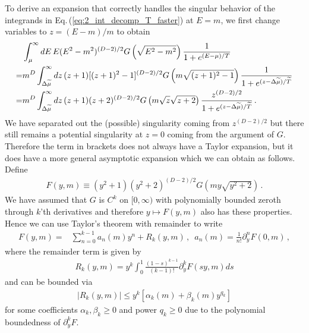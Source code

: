 \documentclass[sn-mathphys,Numbered]{sn-jnl}
\newcommand{\req}[1]{Eq.\,(\ref{#1})}
\begin{document}
To derive an expansion that correctly handles the singular behavior of the integrands in \req{eq:2_int_decomp_T_faster} at $E=m$, we first change variables to $z=(E-m)/m$ to obtain
\begin{align}
&\int_{\mu}^\infty dE\, E(E^2-m^2)^{(D-2)/2} G\left(\sqrt{E^2-m^2}\right)
 \frac{1}{1+e^{(E-\mu)/T}}\notag \\
 =&m^{D}\int_{\Delta\widetilde{\mu}}^\infty dz\, (z+1)[(z+1)^2-1]^{(D-2)/2} G\left(m\sqrt{(z+1)^2-1}\right)
 \frac{1}{1+e^{(z-\Delta\widetilde{\mu})/\widetilde{T}}} \notag\\
 =&m^{D}\int_{\Delta\widetilde{\mu}}^\infty dz\, (z+1)( z+2)^{(D-2)/2} G\left(m\sqrt{z}\sqrt{z+2}\right)
 \frac{z^{(D-2)/2}}{1+e^{(z-\Delta\widetilde{\mu})/\widetilde{T}}} \,.\label{eq:T_faster_int_1_change_vars}
\end{align}
We have separated out the (possible) singularity coming from $z^{(D-2)/2}$ but there still remains a potential singularity at $z=0$ coming from the argument of $G$. Therefore the term in brackets does not always have a Taylor expansion, but it does have a more general asymptotic expansion which we can obtain as follows. Define 
\begin{align}\label{eq:F_y_m_def}
 F(y,m)\equiv (y^2+1)( y^2+2)^{(D-2)/2} G\left(my\sqrt{y^2+2}\right)\,.
\end{align}
We have assumed that $G$ is $C^k$ on $[0,\infty)$ with polynomially bounded zeroth through $k$'th derivatives and therefore $y\mapsto F(y,m)$ also has these properties. Hence we can use Taylor's theorem with remainder to write
\begin{align}\label{eq:F_y_m_Taylor}
F(y,m)=&\sum_{n=0}^{k-1} a_n(m)y^n +R_k(y,m)\,, \,\,\,a_n(m)=\frac{1}{n!}\partial_y^n F(0,m)\,,
\end{align}
where the remainder term is given by
\begin{align}
R_k(y,m)=y^k \int_0^1\frac{(1-s)^{k-1}}{(k-1)!}\partial_y^k F(sy,m)ds
\end{align}
and can be bounded via
\begin{align}\label{eq:R_k_poly_bound}
|R_k(y,m)|\leq y^k[\alpha_k(m)+\beta_k(m)y^{q_k}]
\end{align}
for some coefficients $\alpha_k,\beta_k\geq 0$ and power $q_k\geq 0$ due to the polynomial boundedness of $\partial_y^k F$.
\end{document}
